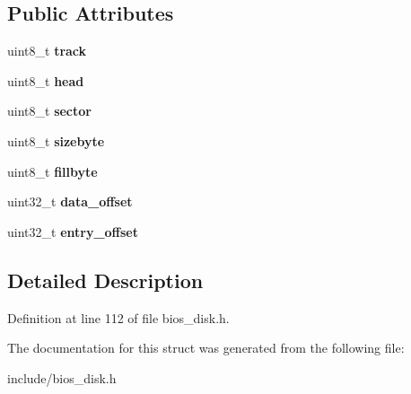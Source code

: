 \subsection*{Public Attributes}
\begin{DoxyCompactItemize}
\item 
\hypertarget{structimageDiskVFD_1_1vfdentry_a584716a3b21efbb6fb92e6d4a9fd30bf}{uint8\-\_\-t {\bfseries track}}\label{structimageDiskVFD_1_1vfdentry_a584716a3b21efbb6fb92e6d4a9fd30bf}

\item 
\hypertarget{structimageDiskVFD_1_1vfdentry_a4a98505e2f0be19cf7a7a6df5e5ea4a8}{uint8\-\_\-t {\bfseries head}}\label{structimageDiskVFD_1_1vfdentry_a4a98505e2f0be19cf7a7a6df5e5ea4a8}

\item 
\hypertarget{structimageDiskVFD_1_1vfdentry_ab2db645ccdbcbc76267db774f486b972}{uint8\-\_\-t {\bfseries sector}}\label{structimageDiskVFD_1_1vfdentry_ab2db645ccdbcbc76267db774f486b972}

\item 
\hypertarget{structimageDiskVFD_1_1vfdentry_a1f299aea35eccb67232f2f72eb3472b1}{uint8\-\_\-t {\bfseries sizebyte}}\label{structimageDiskVFD_1_1vfdentry_a1f299aea35eccb67232f2f72eb3472b1}

\item 
\hypertarget{structimageDiskVFD_1_1vfdentry_a7bb993c2cfaef8d5b06749015f821986}{uint8\-\_\-t {\bfseries fillbyte}}\label{structimageDiskVFD_1_1vfdentry_a7bb993c2cfaef8d5b06749015f821986}

\item 
\hypertarget{structimageDiskVFD_1_1vfdentry_ae3f61135f4078782c64c798ca905b9df}{uint32\-\_\-t {\bfseries data\-\_\-offset}}\label{structimageDiskVFD_1_1vfdentry_ae3f61135f4078782c64c798ca905b9df}

\item 
\hypertarget{structimageDiskVFD_1_1vfdentry_ac9240537467abe687506ac21be081991}{uint32\-\_\-t {\bfseries entry\-\_\-offset}}\label{structimageDiskVFD_1_1vfdentry_ac9240537467abe687506ac21be081991}

\end{DoxyCompactItemize}


\subsection{Detailed Description}


Definition at line 112 of file bios\-\_\-disk.\-h.



The documentation for this struct was generated from the following file\-:\begin{DoxyCompactItemize}
\item 
include/bios\-\_\-disk.\-h\end{DoxyCompactItemize}

